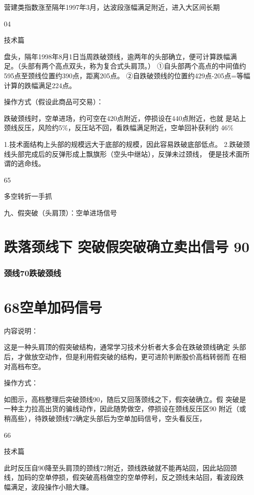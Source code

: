 \documentclass{article}
\begin{document}
营建类指数涨至隔年1997年3月，达波段涨幅满足附近，进入大区间长期

04

\clearpage

技术篇

盘头，隔年1998年8月1日当周跌破颈线，逾两年的头部确立，便可计算跌幅满 足。（头部有两个高点双头，称为复合式头肩顶。） ①自头部两个高点的中间值约595点至颈线位置约390点，距离205点。 ②自跌破颈线的位置约429点-205点=等幅计算的跌幅满足224点。

操作方式（假设此商品可交易）：

跌破颈线时，空单进场，约可空在420点附近，停损设在440点附近，也就 是站上颈线反压，风险约5\%，反压站不回，看跌幅满足附近，空单回补获利约 46\%

1.技术面结构上头部的规模远大于底部的规模，因此容易跌破底部低点。 2.跌破颈线头部完成后的反弹形成上飘旗形（空头中继站），反弹未过颈线， 便是技术面所谓的逃命线。

65

\clearpage

多空转折一手抓

九、假突破（头肩顶）：空单进场信号

\section{跌落颈线下 突破假突破确立卖出信号 90}

\subsubsection{颈线70跌破颈线}

\section{68空单加码信号}

内容说明：

这是一种头肩顶的假突破结构，通常学习技术分析者大多会在跌破颈线确定 头部后，才做放空动作，但是利用假突破的结构，更可进阶判断股价高档转弱而 在相对高档布空。

操作方式：

如图示，高档整理后突破颈线90，随后又回落颈线之下，假突破确立。假 突破是一种主力拉高出货的骗线动作，因此随势做空，停损设在颈线反压区90 附近（或稍高些），待跌破颈线72确定头部后为空单加码信号，空头看反压，

66

\clearpage

技术篇

此时反压自90降至头肩顶的颈线72附近，颈线跌破就不能再站回，因此站回颈 线，加码的空单停损，假突破高档做空的空单停利，反之颈线未站回，看波段跌 幅满足，波段操作小赔大赚。
\end{document}
